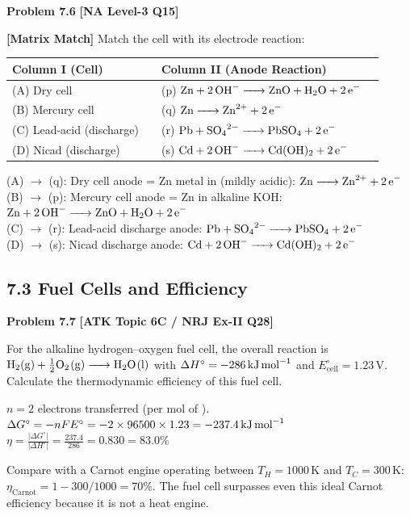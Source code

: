 \begin{problembox}
\textbf{Problem 7.6} \hfill \textbf{[NA Level-3 Q15]}

\textbf{[Matrix Match]} Match the cell with its electrode reaction:

\begin{tabular}{ll@{\quad}ll}
\toprule
\textbf{Column I (Cell)} & & \textbf{Column II (Anode Reaction)} & \\
\midrule
(A) Dry cell & & (p) $\ce{Zn + 2OH- -> ZnO + H2O + 2e-}$ & \\
(B) Mercury cell & & (q) $\ce{Zn -> Zn^2+ + 2e-}$ & \\
(C) Lead-acid (discharge) & & (r) $\ce{Pb + SO4^2- -> PbSO4 + 2e-}$ & \\
(D) Nicad (discharge) & & (s) $\ce{Cd + 2OH- -> Cd(OH)2 + 2e-}$ & \\
\bottomrule
\end{tabular}
\end{problembox}
\begin{solution}
(A) $\to$ (q): Dry cell anode = Zn metal in  (mildly acidic): $\ce{Zn -> Zn^2+ + 2e-}$\\
(B) $\to$ (p): Mercury cell anode = Zn in alkaline KOH: $\ce{Zn + 2OH- -> ZnO + H2O + 2e-}$\\
(C) $\to$ (r): Lead-acid discharge anode: $\ce{Pb + SO4^2- -> PbSO4 + 2e-}$\\
(D) $\to$ (s): Nicad discharge anode: $\ce{Cd + 2OH- -> Cd(OH)2 + 2e-}$
\end{solution}

\subsection{7.3 Fuel Cells and Efficiency}

\begin{problembox}
\textbf{Problem 7.7} \hfill \textbf{[ATK Topic 6C / NRJ Ex-II Q28]}

For the alkaline hydrogen--oxygen fuel cell, the overall reaction is $\ce{H2(g) + \frac{1}{2}O2(g) -> H2O(l)}$ with $\Delta H^\circ = -286\,\text{kJ\,mol}^{-1}$ and $E^\circ_{\text{cell}} = 1.23\,\text{V}$. Calculate the thermodynamic efficiency of this fuel cell.
\end{problembox}
\begin{solution}
$n = 2$ electrons transferred (per mol of ).\\
$\Delta G^\circ = -nFE^\circ = -2 \times 96500 \times 1.23 = -237.4\,\text{kJ\,mol}^{-1}$\\
$\eta = \frac{|\Delta G^\circ|}{|\Delta H^\circ|} = \frac{237.4}{286} = 0.830 = \mathbf{83.0\%}$

Compare with a Carnot engine operating between $T_H = 1000\,\text{K}$ and $T_C = 300\,\text{K}$: $\eta_{\text{Carnot}} = 1 - 300/1000 = 70\%$.
The fuel cell surpasses even this ideal Carnot efficiency because it is not a heat engine.
\end{solution}

